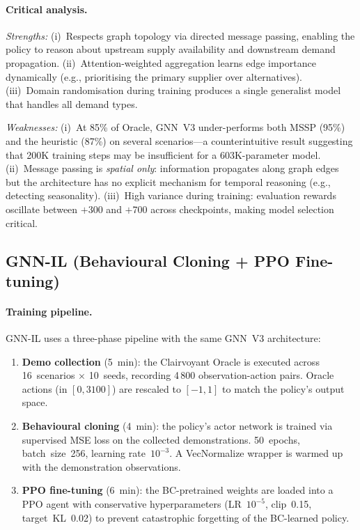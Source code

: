 \paragraph{Critical analysis.}
\emph{Strengths:} (i)~Respects graph topology via directed message passing,
enabling the policy to reason about upstream supply availability and
downstream demand propagation. (ii)~Attention-weighted aggregation
learns edge importance dynamically (e.g., prioritising the primary
supplier over alternatives). (iii)~Domain randomisation during training
produces a single generalist model that handles all demand types.

\emph{Weaknesses:} (i)~At 85\% of Oracle, GNN~V3 under-performs both
MSSP (95\%) and the heuristic (87\%) on several scenarios---a
counterintuitive result suggesting that 200K training steps may
be insufficient for a 603K-parameter model. (ii)~Message passing
is \emph{spatial only}: information propagates along graph edges but
the architecture has no explicit mechanism for temporal reasoning
(e.g., detecting seasonality). (iii)~High variance during training:
evaluation rewards oscillate between $+$300 and $+$700 across
checkpoints, making model selection critical.

\subsection{GNN-IL (Behavioural Cloning + PPO Fine-tuning)}

\paragraph{Training pipeline.}
GNN-IL uses a three-phase pipeline with the same GNN~V3 architecture:

\begin{enumerate}
  \item \textbf{Demo collection} (5~min): the Clairvoyant Oracle is executed
        across 16~scenarios $\times$ 10~seeds, recording 4\,800 observation-action
        pairs. Oracle actions (in $[0, 3100]$) are rescaled to $[-1, 1]$
        to match the policy's output space.
  \item \textbf{Behavioural cloning} (4~min): the policy's actor network is
        trained via supervised MSE loss on the collected demonstrations.
        50~epochs, batch~size~256, learning rate~$10^{-3}$. A VecNormalize
        wrapper is warmed up with the demonstration observations.
  \item \textbf{PPO fine-tuning} (6~min): the BC-pretrained weights are loaded
        into a PPO agent with conservative hyperparameters (LR~$10^{-5}$,
        clip~0.15, target~KL~0.02) to prevent catastrophic forgetting of the
        BC-learned policy.
\end{enumerate}

